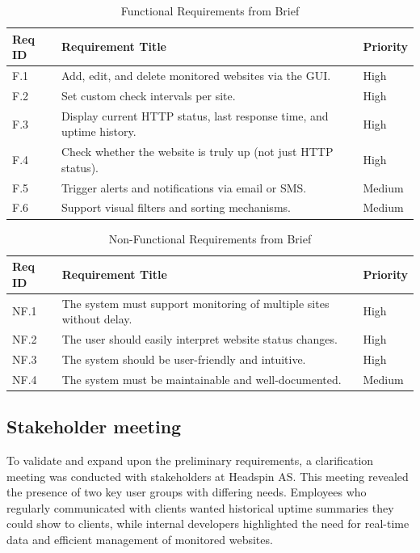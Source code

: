 \begin{table}[H]
\centering
\caption{Functional Requirements from Brief}
\label{tab:functional_reqs_brief}
\begin{tabular}{| l  |p{}  |l |} 
\hline
\textbf{Req ID} & \textbf{Requirement Title} & \textbf{Priority} \\
\hline
F.1 & Add, edit, and delete monitored websites via the GUI. & High \\ \hline 
F.2 & Set custom check intervals per site. & High \\ \hline 
F.3 & Display current HTTP status, last response time, and uptime history. & High \\ \hline 
F.4 & Check whether the website is truly up (not just HTTP status). & High \\ \hline 
F.5 & Trigger alerts and notifications via email or SMS. & Medium \\ \hline
F.6 & Support visual filters and sorting mechanisms. & Medium \\
\hline
\end{tabular}
\end{table}

\begin{table}[H]
    \centering
    \caption{Non-Functional Requirements from Brief}
    \label{tab:non_functional_reqs_brief}
    \begin{tabular}{| l  |p{}  |l |}
        \hline
        \textbf{Req ID} & \textbf{Requirement Title} & \textbf{Priority} \\
        \hline
        NF.1 & The system must support monitoring of multiple sites without delay. & High \\ \hline 
        NF.2 & The user should easily interpret website status changes. & High \\ \hline 
        NF.3 & The system should be user-friendly and intuitive. & High \\ \hline 
        NF.4 & The system must be maintainable and well-documented. & Medium \\ \hline
    \end{tabular}
\end{table}

\subsection{Stakeholder meeting}

To validate and expand upon the preliminary requirements, a clarification meeting was conducted with stakeholders at Headspin AS. This meeting revealed the presence of two key user groups with differing needs. Employees who regularly communicated with clients wanted historical uptime summaries they could show to clients, while internal developers highlighted the need for real-time data and efficient management of monitored websites.

